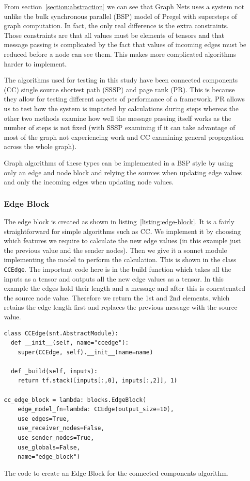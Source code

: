 \documentclass[sigconf,nonacm]{acmart}
\begin{document}
From section~\ref{section:abstraction} we can see that Graph Nets uses a system not unlike the bulk synchronous parallel (BSP) model of Pregel with supersteps of graph computation. In fact, the only real difference is the extra constraints. Those constraints are that all values must be elements of tensors and that message passing is complicated by the fact that values of incoming edges must be reduced before a node can see them. This makes more complicated algorithms harder to implement.

The algorithms used for testing in this study have been connected components (CC) single source shortest path (SSSP) and page rank (PR). This is because they allow for testing different aspects of performance of a framework. PR allows us to test how the system is impacted by calculations during steps whereas the other two methods examine how well the message passing itself works as the number of steps is not fixed (with SSSP examining if it can take advantage of most of the graph not experiencing work and CC examining general propagation across the whole graph).

Graph algorithms of these types can be implemented in a BSP style by using only an edge and node block and relying the sources when updating edge values and only the incoming edges when updating node values.

\subsubsection{Edge Block}

The edge block is created as shown in listing~\ref{listing:edge-block}. It is a fairly straightforward for simple algorithms such as CC. We implement it by choosing which features we require to calculate the new edge values (in this example just the previous value and the sender nodes). Then we give it a sonnet module implementing the model to perform the calculation. This is shown in the class \texttt{CCEdge}. The important code here is in the build function which takes all the inputs as a tensor and outputs all the new edge values as a tensor. In this example the edges hold their length and a message and after this is concatenated the source node value. Therefore we return the 1st and 2nd elements, which retains the edge length first and replaces the previous message with the source value.

\begin{listing}[ht]
\small{}
\begin{verbatim}
class CCEdge(snt.AbstractModule):
  def __init__(self, name="ccedge"):
    super(CCEdge, self).__init__(name=name)

  def _build(self, inputs):
    return tf.stack([inputs[:,0], inputs[:,2]], 1)
                          
cc_edge_block = lambda: blocks.EdgeBlock(
    edge_model_fn=lambda: CCEdge(output_size=10),
    use_edges=True,
    use_receiver_nodes=False,
    use_sender_nodes=True,
    use_globals=False,
    name="edge_block")
\end{verbatim}
\caption{The code to create an Edge Block for the connected components algorithm.}
\label{listing:edge-block}
\end{listing}
\end{document}
